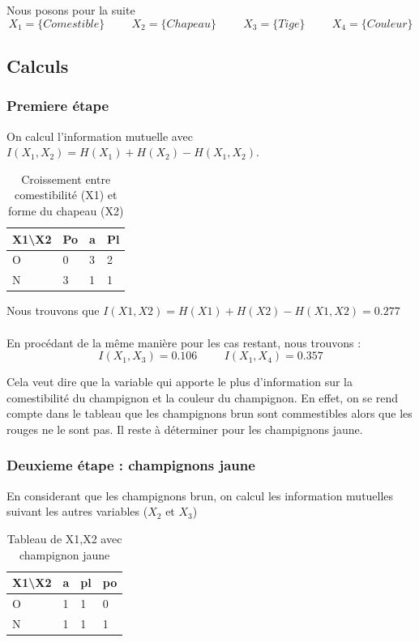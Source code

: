 \documentclass{article}
\begin{document}
Nous posons pour la suite
\[
X_1 = \{Comestible\} \hspace{1cm} X_2 = \{Chapeau\} \hspace{1cm} X_3 = \{Tige\} \hspace{1cm} X_4 = \{Couleur\}
\]

\subsection{Calculs}

\subsubsection{Premiere étape}
On calcul l'information mutuelle avec $I(X_1,X_2) = H(X_1) + H(X_2) - H(X_1,X_2)$.

\begin{table}[H]
  \centering
    \caption{Croissement entre comestibilité (X1) et forme du chapeau (X2)}
    \begin{tabular}{|l|l|l|l|}
    \hline
    X1\textbackslash{}X2 & Po & a & Pl \\ \hline
    O                    & 0  & 3 & 2  \\ \hline
    N                    & 3  & 1 & 1  \\ \hline
    \end{tabular}
\end{table}
Nous trouvons que $I(X1,X2)=H(X1)+H(X2)-H(X1,X2)=0.277$
\\\\
En procédant de la même manière pour les cas restant, nous trouvons :
\[
  I(X_1,X_3)=0.106 \hspace{1cm} I(X_1,X_4)=0.357
\]

Cela veut dire que la variable qui apporte le plus d'information sur la comestibilité du champignon et la couleur du champignon.
En effet, on se rend compte dans le tableau que les champignons brun sont commestibles alors que les rouges ne le sont pas. Il reste à déterminer pour les champignons jaune.
    
\subsubsection{Deuxieme étape : champignons jaune}
En considerant que les champignons brun, on calcul les information mutuelles suivant les autres variables ($X_2$ et $X_3$)

\begin{table}[H]
  \caption{Tableau de X1,X2 avec champignon jaune}
  \centering
  \begin{tabular}{|l|l|l|l|}
  \hline
  X1\textbackslash{}X2 & a & pl & po \\ \hline
  O                    & 1 & 1  & 0  \\ \hline
  N                    & 1 & 1  & 1  \\ \hline
  \end{tabular}
  \end{table}
\end{document}
